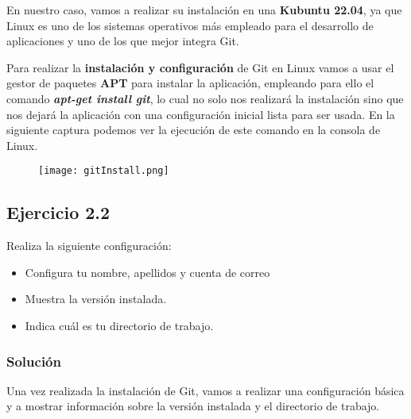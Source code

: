 En nuestro caso, vamos a realizar su instalación en una \textbf{Kubuntu 22.04}, ya que Linux es uno de los sistemas operativos más empleado para el desarrollo de aplicaciones y uno de los que mejor integra Git.

Para realizar la \textbf{instalación y configuración} de Git en Linux vamos a usar el gestor de paquetes \textbf{APT} para instalar la aplicación, empleando para ello el comando \textbf{\textit{apt-get install git}}, lo cual no solo nos realizará la instalación sino que nos dejará la aplicación con una configuración inicial lista para ser usada. En la siguiente captura podemos ver la ejecución de este comando en la consola de Linux.

    \begin{figure}[H]
        \centering
        \texttt{[image: gitInstall.png]}
    \end{figure}


\subsection{Ejercicio 2.2}
Realiza la siguiente configuración:

\begin{itemize}
    \item Configura tu nombre, apellidos y cuenta de correo
    \item Muestra la versión instalada.
    \item Indica cuál es tu directorio de trabajo.
\end{itemize}

\subsubsection{Solución}
Una vez realizada la instalación de Git, vamos a realizar una configuración básica y a mostrar información sobre la versión instalada y el directorio de trabajo.

